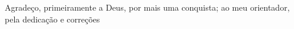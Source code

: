 %
%

\begin{agradecimento}
    \noindent Agradeço, primeiramente a Deus, por mais uma conquista; ao meu orientador, pela dedicação e correções

    \noindent \textbf{}
\end{agradecimento}


